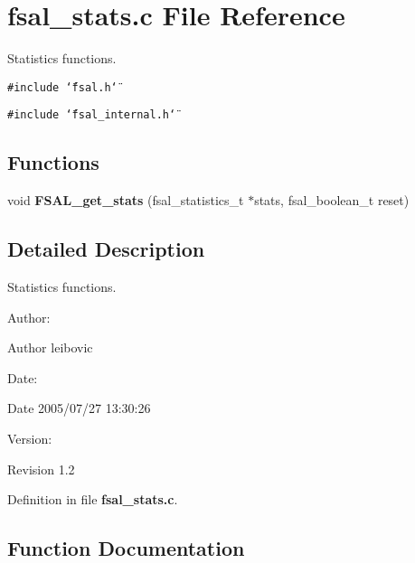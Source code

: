 \section{fsal\_\-stats.c File Reference}
\label{fsal__stats_8c}
Statistics functions. 

{\tt \#include \char`\"{}fsal.h\char`\"{}}\par
{\tt \#include \char`\"{}fsal\_\-internal.h\char`\"{}}\par
\subsection*{Functions}
\begin{CompactItemize}
\item 
void {\bf FSAL\_\-get\_\-stats} (fsal\_\-statistics\_\-t $\ast$stats, fsal\_\-boolean\_\-t reset)
\end{CompactItemize}


\subsection{Detailed Description}
Statistics functions. 

\begin{Desc}
\item[Author:]\begin{Desc}
\item[Author]leibovic \end{Desc}
\end{Desc}
\begin{Desc}
\item[Date:]\begin{Desc}
\item[Date]2005/07/27 13:30:26 \end{Desc}
\end{Desc}
\begin{Desc}
\item[Version:]\begin{Desc}
\item[Revision]1.2 \end{Desc}
\end{Desc}


Definition in file {\bf fsal\_\-stats.c}.

\subsection{Function Documentation}
